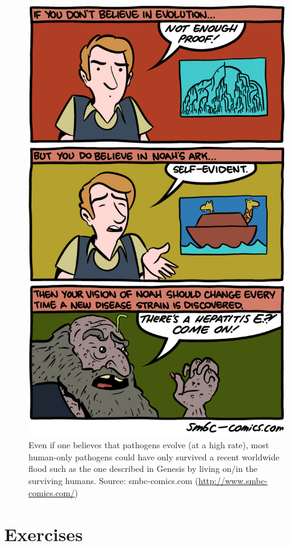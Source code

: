 \documentclass[]{book}
\theoremstyle{definition}
\theoremstyle{definition}
\theoremstyle{definition}
\theoremstyle{remark}
\begin{document}
\begin{figure}
\centering
\includegraphics{./images/smbc-ID-evolution.png}
\caption{Even if one believes that pathogens evolve (at a high rate),
most human-only pathogens could have only survived a recent worldwide
flood such as the one described in Genesis by living on/in the surviving
humans. Source: smbc-comics.com (\url{http://www.smbc-comics.com/})}
\end{figure}

\section{Exercises}\label{exercises-13}
\end{document}
